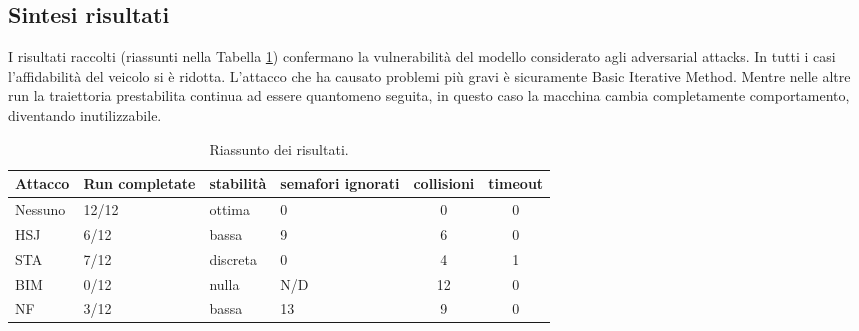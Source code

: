 \subsection{Sintesi risultati}
I risultati raccolti (riassunti nella Tabella \ref{tab:ria}) confermano la vulnerabilità del modello considerato agli adversarial attacks. In tutti i casi l'affidabilità del veicolo si è ridotta.
L'attacco che ha causato problemi più gravi è sicuramente Basic Iterative Method. Mentre nelle altre run la traiettoria prestabilita continua ad essere quantomeno seguita, in questo
caso la macchina cambia completamente comportamento, diventando inutilizzabile.
\begin{table}[h]
    \begin{tabular}{|p{1.5cm}|p{2.5cm}|p{2cm}|p{1.5cm}|c|c|}
        \hline
        Attacco        &   Run completate     &   stabilità     &  semafori ignorati        & collisioni & timeout\\
        \hline
        Nessuno        &  12/12               &   ottima        &  0                       & 0          & 0 \\
        HSJ            &  6/12                &   bassa         &  9                        & 6          & 0 \\
        STA            &  7/12                &   discreta      &  0                        & 4          & 1 \\
        BIM            &  0/12                &   nulla         &  N/D                      & 12         & 0\\
        NF             &  3/12                &   bassa         &   13                      & 9          & 0 \\
        \hline
    \end{tabular}
    \caption{Riassunto dei risultati.}
    \label{tab:ria}
\end{table}